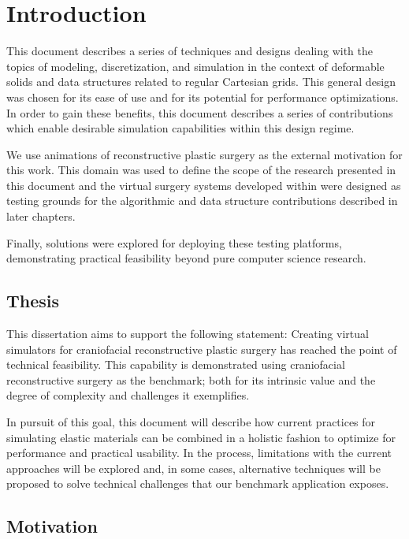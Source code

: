 \chapter{Introduction}

This document describes a series of techniques and designs dealing
with the topics of modeling, discretization, and simulation in the
context of deformable solids and data structures related to regular
Cartesian grids. This general design was chosen for its ease of use
and for its potential for performance optimizations. In order to gain
these benefits, this document describes a series of contributions
which enable desirable simulation capabilities within this design
regime.

We use animations of reconstructive plastic surgery as the external
motivation for this work. This domain was used to define the scope of
the research presented in this document and the virtual surgery
systems developed within were designed as testing grounds for the
algorithmic and data structure contributions described in later
chapters.

Finally, solutions were explored for deploying these testing
platforms, demonstrating practical feasibility beyond pure computer
science research.

\section{Thesis}


This dissertation aims to support the following statement: Creating
virtual simulators for craniofacial reconstructive plastic surgery has
reached the point of technical feasibility. This capability is
demonstrated using craniofacial reconstructive surgery as the
benchmark; both for its intrinsic value and the degree of complexity
and challenges it exemplifies.

In pursuit of this goal, this document will describe how current
practices for simulating elastic materials can be combined in a
holistic fashion to optimize for performance and practical
usability. In the process, limitations with the current approaches
will be explored and, in some cases, alternative techniques will be
proposed to solve technical challenges that our benchmark application
exposes.


\section{Motivation}

